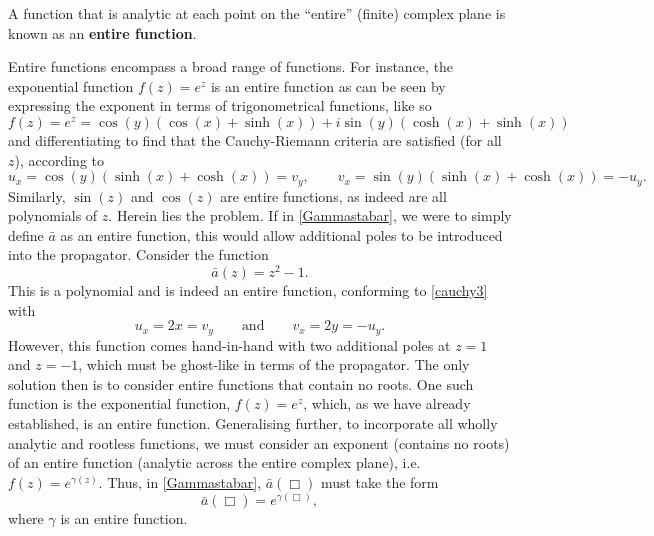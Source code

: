 \begin{definition} A function that is analytic at each point on the ``entire'' (finite) complex plane is known as an \textbf{entire function}. 
\end{definition}
Entire functions encompass a broad range of functions. For instance, the exponential function $f(z)=e^z$ is an entire function as can be seen by expressing the exponent in terms of trigonometrical functions, like so
\[
f(z)=e^z=\cos (y)(\cos (x)+\sinh (x))+i\sin (y)(\cosh (x)+\sinh (x))
\]
and differentiating to find that the Cauchy-Riemann criteria are satisfied (for all $z$), according to
\[
u_{x}=\cos(y)\left(\sinh(x)+\cosh(x)\right)=v_{y}
 ,\qquad
v_{x}=\sin(y)\left(\sinh(x)+\cosh(x)\right)=-u_{y}
. \]
Similarly, $\sin (z)$ and $\cos (z)$ are  entire functions, as indeed are all polynomials of $z$. Herein lies the problem. If in \eqref{Gammastabar}, we were to simply define ${\bar a}$ as an entire function, this would allow additional poles to be introduced into the propagator. Consider the function
\[
{\bar a}(z)=z^2-1.
\]
This is a polynomial and is indeed an entire function, conforming to \eqref{cauchy3} with
\[
u_x=2x=v_y\qquad\mbox{and}\qquad v_x=2y=-u_y
.\]
However, this function comes hand-in-hand with two additional poles at $z=1$ and $z=-1$, which must be ghost-like in terms of the propagator. The only solution then is to consider entire functions that contain no roots. One such function is the exponential function, $f(z)=e^z$, which, as we have already established, is an entire function. 
Generalising further, to incorporate all wholly analytic and rootless functions, we must consider an exponent (contains no roots) of an entire function (analytic across the entire complex plane), i.e. $f(z)=e^{\gamma(z)}$. Thus, in \eqref{Gammastabar}, ${\bar a}(\Box)$ must take the form
\[
{\bar a}(\Box)=e^{\gamma(\Box)}
,\]
where $\gamma$ is an entire function.
